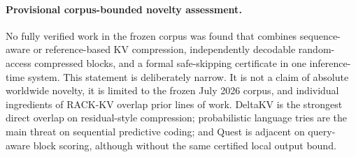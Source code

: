 \begin{table}[t]
  \centering
  \small
  
  \caption{Compact comparison with representative long-context methods. The project baselines labeled \enquote{-style} are source-inspired approximations rather than exact reproductions of the original systems.}
  \label{tab:related}
\end{table}

\paragraph{Provisional corpus-bounded novelty assessment.}
No fully verified work in the frozen corpus was found that combines sequence-aware or reference-based KV compression, independently decodable random-access compressed blocks, and a formal safe-skipping certificate in one inference-time system. This statement is deliberately narrow. It is not a claim of absolute worldwide novelty, it is limited to the frozen July 2026 corpus, and individual ingredients of RACK-KV overlap prior lines of work. DeltaKV is the strongest direct overlap on residual-style compression; probabilistic language tries are the main threat on sequential predictive coding; and Quest is adjacent on query-aware block scoring, although without the same certified local output bound.
